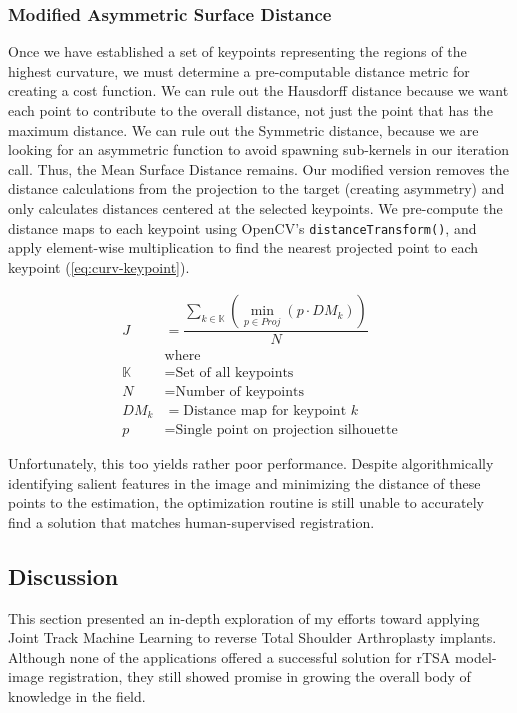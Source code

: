 \subsubsection{Modified Asymmetric Surface Distance}
Once we have established a set of keypoints representing the regions of the highest curvature, we must determine a pre-computable distance metric for creating a cost function.
We can rule out the Hausdorff distance because we want each point to contribute to the overall distance, not just the point that has the maximum distance.
We can rule out the Symmetric distance, because we are looking for an asymmetric function to avoid spawning sub-kernels in our iteration call.
Thus, the Mean Surface Distance remains.
Our modified version removes the distance calculations from the projection to the target (creating asymmetry) and only calculates distances centered at the selected keypoints.
We pre-compute the distance maps to each keypoint using OpenCV's \texttt{distanceTransform()}, and apply element-wise multiplication to find the nearest projected point to each keypoint (\cref{eq:curv-keypoint}).

\begin{equation}
  \label{eq:curv-keypoint}
  \begin{split}
    \displaystyle J &= \dfrac{\sum_{k \in \mathbb{K}}(\min_{p\in Proj}(p \cdot DM_{k}))}{N} \\
      &\text{where}\\
    \mathbb{K} &= \text{Set of all keypoints} \\
    N &= \text{Number of keypoints} \\
    DM_{k} &= \text{Distance map for keypoint $k$} \\
    p &= \text{Single point on projection silhouette}
  \end{split}
\end{equation}

Unfortunately, this too yields rather poor performance.
Despite algorithmically identifying salient features in the image and minimizing the distance of these points to the estimation, the optimization routine is still unable to accurately find a solution that matches human-supervised registration.

\subsection{Discussion}
This section presented an in-depth exploration of my efforts toward applying Joint Track Machine Learning to reverse Total Shoulder Arthroplasty implants.
Although none of the applications offered a successful solution for rTSA model-image registration, they still showed promise in growing the overall body of knowledge in the field.

